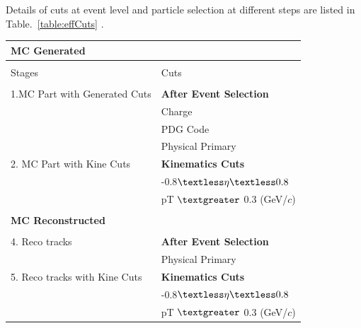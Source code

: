 \newpage
Details of cuts at event level and particle selection at different steps are listed in Table.~\ref{table:effCuts} . \\
\begin{table}[h]
\small
\centering %

\begin{tabular}{  p{5cm} |  p{8.5cm} }
 \\
  \multirow{1}{*}{\large \textbf {MC Generated }} \\
\hline
\\
     Stages         &              Cuts \\
\hline\hline & \\		            	
  1.MC Part with Generated Cuts         &    {\textbf {After Event Selection}}\\
																		   & Charge\\
																		    & PDG Code\\
														  				  & Physical Primary \\

   2. MC Part with Kine Cuts         &              {\textbf {Kinematics Cuts }}\\
															    & -0.8$\textless \eta \textless  0.8$\\
															    & pT $\textgreater$ 0.3 (GeV/$c$)\\

&		\\            	


\multirow{1}{*}{\large \textbf {MC Reconstructed }} & \\
\hline


\hline & \\		            	                        	
4. Reco tracks        &                             {\textbf {After Event Selection}}\\
															   & Physical Primary \\
															
															
5. Reco tracks with Kine Cuts         &               {\textbf  {Kinematics Cuts }}\\
															    & -0.8$\textless \eta \textless  0.8$\\
															    & pT $\textgreater$ 0.3 (GeV/$c$)\\




\end{tabular}
\end{table}
